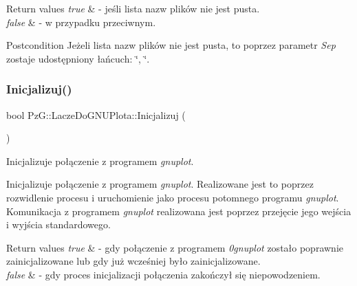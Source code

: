 \begin{DoxyRetVals}{Return values}
{\em true} & -\/ jeśli lista nazw plików nie jest pusta. \\
\hline
{\em false} & -\/ w przypadku przeciwnym. \\
\hline
\end{DoxyRetVals}
\begin{DoxyPostcond}{Postcondition}
Jeżeli lista nazw plików nie jest pusta, to poprzez parametr {\itshape Sep} zostaje udostępniony łańcuch\+: \char`\"{}, \char`\"{}. 
\end{DoxyPostcond}
\mbox{\label{classPzG_1_1LaczeDoGNUPlota_a200ce6bdb980c314a9eafe49e8f2dd5e}} 
\subsubsection{\texorpdfstring{Inicjalizuj()}{Inicjalizuj()}}
{\footnotesize\ttfamily bool Pz\+G\+::\+Lacze\+Do\+G\+N\+U\+Plota\+::\+Inicjalizuj (\begin{DoxyParamCaption}{ }\end{DoxyParamCaption})}



Inicjalizuje połączenie z programem {\itshape gnuplot}. 

Inicjalizuje połączenie z programem {\itshape gnuplot}. Realizowane jest to poprzez rozwidlenie procesu i uruchomienie jako procesu potomnego programu {\itshape gnuplot}. Komunikacja z programem {\itshape gnuplot} realizowana jest poprzez przejęcie jego wejścia i wyjścia standardowego.


\begin{DoxyRetVals}{Return values}
{\em true} & -\/ gdy połączenie z programem {\itshape 0gnuplot} zostało poprawnie zainicjalizowane lub gdy już wcześniej było zainicjalizowane. \\
\hline
{\em false} & -\/ gdy proces inicjalizacji połączenia zakończył się niepowodzeniem. \\
\hline
\end{DoxyRetVals}
\mbox{\label{classPzG_1_1LaczeDoGNUPlota_a90056743aeaa546721528005f2cf41e6}} 
